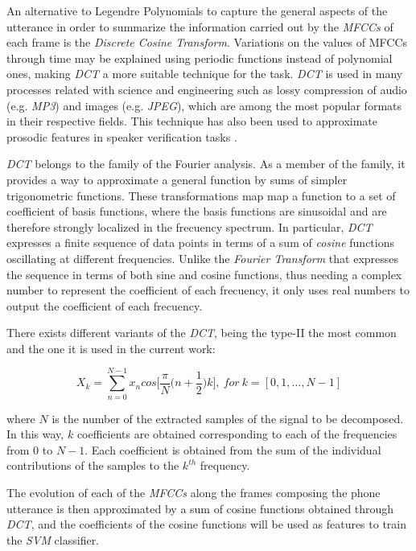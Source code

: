 An alternative to Legendre Polynomials to capture the general aspects of the utterance in order to
summarize the information carried out by the \textit{MFCCs} of each frame is the
\textit{Discrete Cosine Transform}. Variations on the values of MFCCs through time may be explained
using periodic functions instead of polynomial ones, making \textit{DCT} a more suitable technique
for the task. \textit{DCT} is used in many processes related with science and engineering
such as lossy compression of audio (e.g. \textit{MP3}) and images (e.g. \textit{JPEG}), which are
among the most popular formats in their respective fields. This technique has also been used
to approximate prosodic features in speaker verification tasks \cite{dct}.

\textit{DCT} belongs to the family of the Fourier analysis. As a member of the family, it
provides a way to approximate a general function by sums of simpler trigonometric functions.
These transformations map map a function to a set of coefficient of basis functions, where
the basis functions are sinusoidal and are therefore strongly localized in the frecuency spectrum.
In particular, \textit{DCT} expresses a finite sequence of data points in terms of a sum of
\textit{cosine} functions oscillating at different frequencies. Unlike the
\textit{Fourier Transform} that expresses the sequence in terms of both sine and cosine functions,
thus needing a complex number to represent the coefficient of each frecuency, it only uses real
numbers to output the coefficient of each frecuency.

There exists different variants of the \textit{DCT}, being the type-II
the most common and the one it is used in the current work:

\begin{equation}
X_{k} = \sum_{n=0}^{N-1} x_{n} cos \Big[ \frac{\pi}{N} \Big( n + \frac{1}{2} \Big) k \Big], \ for \ k = [0, 1, \dotsc, N-1]
\end{equation}

where $N$ is the number of the extracted samples of the signal to be decomposed.
In this way, $k$ coefficients are obtained corresponding to each of the frequencies from
$0$ to $N-1$. Each coefficient is obtained from the sum of the individual contributions
of the samples to the $k^{th}$ frequency.

The evolution of each of the \textit{MFCCs} along the frames composing the phone utterance is
then approximated by a sum of cosine functions obtained through \textit{DCT}, and the
coefficients of the cosine functions will be used as features to train the \textit{SVM} classifier.